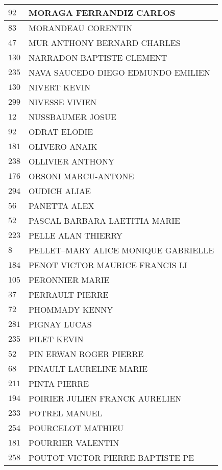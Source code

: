 \begin{xltabular}{\linewidth}{|l|X|}
    \hline
    $92$ & MORAGA FERRANDIZ CARLOS \\
    \hline
    $83$ & MORANDEAU CORENTIN \\
    \hline
    $47$ & MUR ANTHONY BERNARD CHARLES \\
    \hline
    $130$ & NARRADON BAPTISTE CLEMENT \\
    \hline
    $235$ & NAVA SAUCEDO DIEGO EDMUNDO EMILIEN \\
    \hline
    $130$ & NIVERT KEVIN \\
    \hline
    $299$ & NIVESSE VIVIEN \\
    \hline
    $12$ & NUSSBAUMER JOSUE \\
    \hline
    $92$ & ODRAT ELODIE \\
    \hline
    $181$ & OLIVERO ANAIK \\
    \hline
    $238$ & OLLIVIER ANTHONY \\
    \hline
    $176$ & ORSONI MARCU-ANTONE \\
    \hline
    $294$ & OUDICH ALIAE \\
    \hline
    $56$ & PANETTA ALEX \\
    \hline
    $52$ & PASCAL BARBARA LAETITIA MARIE \\
    \hline
    $223$ & PELLE ALAN THIERRY \\
    \hline
    $8$ & PELLET--MARY ALICE MONIQUE GABRIELLE \\
    \hline
    $184$ & PENOT VICTOR MAURICE FRANCIS LI \\
    \hline
    $105$ & PERONNIER MARIE \\
    \hline
    $37$ & PERRAULT PIERRE \\
    \hline
    $72$ & PHOMMADY KENNY \\
    \hline
    $281$ & PIGNAY LUCAS \\
    \hline
    $235$ & PILET KEVIN \\
    \hline
    $52$ & PIN ERWAN ROGER PIERRE \\
    \hline
    $68$ & PINAULT LAURELINE MARIE \\
    \hline
    $211$ & PINTA PIERRE \\
    \hline
    $194$ & POIRIER JULIEN FRANCK AURELIEN \\
    \hline
    $233$ & POTREL MANUEL \\
    \hline
    $254$ & POURCELOT MATHIEU \\
    \hline
    $181$ & POURRIER VALENTIN \\
    \hline
    $258$ & POUTOT VICTOR PIERRE BAPTISTE PE \\

\end{xltabular}
